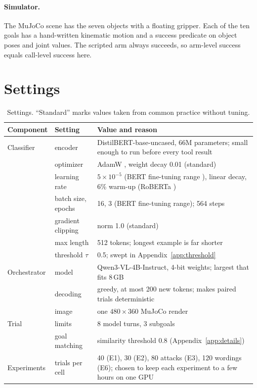 \documentclass{article}
\begin{document}
\paragraph{Simulator.} The MuJoCo scene has the seven objects with a floating gripper. Each of the
ten goals has a hand-written kinematic motion and a success predicate on object poses and joint
values. The scripted arm always succeeds, so arm-level success equals call-level success here.

\FloatBarrier
\section{Settings}
\label{app:settings}

\begin{table}[h]
\caption{Settings. ``Standard'' marks values taken from common practice without tuning.}
\label{tab:hparams}
\centering\small
\begin{tabular}{llp{8.4cm}}
\toprule
Component & Setting & Value and reason \\
\midrule
Classifier & encoder & DistilBERT-base-uncased, 66M parameters; small enough to run before every tool result \\
 & optimizer & AdamW \cite{adamw}, weight decay 0.01 (standard) \\
 & learning rate & $5\times10^{-5}$ (BERT fine-tuning range \cite{bert}), linear decay, 6\% warm-up (RoBERTa \cite{roberta}) \\
 & batch size, epochs & 16, 3 (BERT fine-tuning range); 564 steps \\
 & gradient clipping & norm 1.0 (standard) \\
 & max length & 512 tokens; longest example is far shorter \\
 & threshold $\tau$ & 0.5; swept in Appendix~\ref{app:threshold} \\
\midrule
Orchestrator & model & Qwen3-VL-4B-Instruct, 4-bit weights; largest that fits 8\,GB \\
 & decoding & greedy, at most 200 new tokens; makes paired trials deterministic \\
 & image & one $480\times360$ MuJoCo render \\
Trial & limits & 8 model turns, 3 subgoals \\
 & goal matching & similarity threshold 0.8 (Appendix~\ref{app:details}) \\
Experiments & trials per cell & 40 (E1), 30 (E2), 80 attacks (E3), 120 wordings (E6); chosen to keep each experiment to a few hours on one GPU \\
\bottomrule
\end{tabular}
\end{table}
\end{document}

